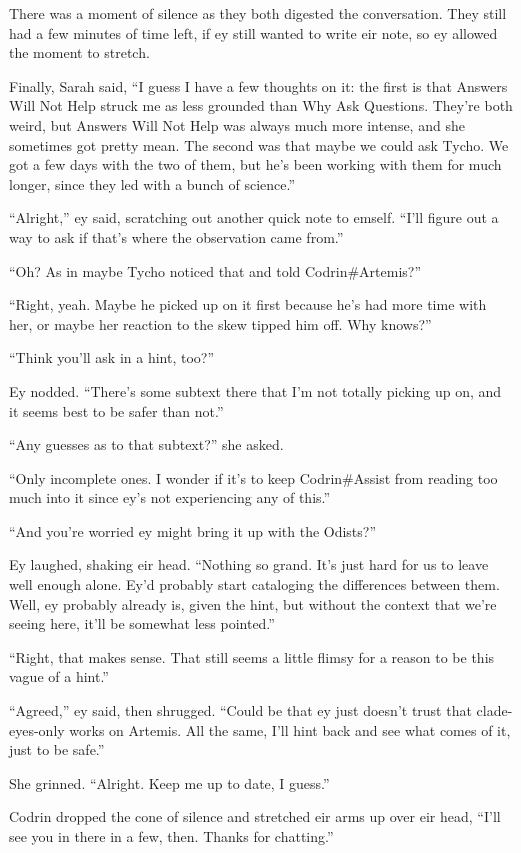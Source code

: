 There was a moment of silence as they both digested the conversation. They still had a few minutes of time left, if ey still wanted to write eir note, so ey allowed the moment to stretch.

Finally, Sarah said, ``I guess I have a few thoughts on it: the first is that Answers Will Not Help struck me as less grounded than Why Ask Questions. They're both weird, but Answers Will Not Help was always much more intense, and she sometimes got pretty mean. The second was that maybe we could ask Tycho. We got a few days with the two of them, but he's been working with them for much longer, since they led with a bunch of science.''

``Alright,'' ey said, scratching out another quick note to emself. ``I'll figure out a way to ask if that's where the observation came from.''

``Oh? As in maybe Tycho noticed that and told Codrin\#Artemis?''

``Right, yeah. Maybe he picked up on it first because he's had more time with her, or maybe her reaction to the skew tipped him off. Why knows?''

``Think you'll ask in a hint, too?''

Ey nodded. ``There's some subtext there that I'm not totally picking up on, and it seems best to be safer than not.''

``Any guesses as to that subtext?'' she asked.

``Only incomplete ones. I wonder if it's to keep Codrin\#Assist from reading too much into it since ey's not experiencing any of this.''

``And you're worried ey might bring it up with the Odists?''

Ey laughed, shaking eir head. ``Nothing so grand. It's just hard for us to leave well enough alone. Ey'd probably start cataloging the differences between them. Well, ey probably already is, given the hint, but without the context that we're seeing here, it'll be somewhat less pointed.''

``Right, that makes sense. That still seems a little flimsy for a reason to be this vague of a hint.''

``Agreed,'' ey said, then shrugged. ``Could be that ey just doesn't trust that clade-eyes-only works on Artemis. All the same, I'll hint back and see what comes of it, just to be safe.''

She grinned. ``Alright. Keep me up to date, I guess.''

Codrin dropped the cone of silence and stretched eir arms up over eir head, ``I'll see you in there in a few, then. Thanks for chatting.''


